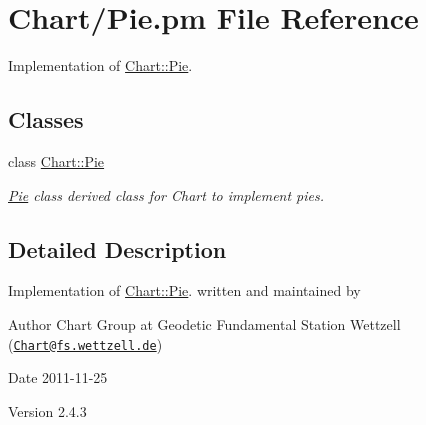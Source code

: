 \hypertarget{Pie_8pm}{
\section{Chart/Pie.pm File Reference}
\label{Pie_8pm}
}


Implementation of \hyperlink{classChart_1_1Pie}{Chart::Pie}.  


\subsection*{Classes}
\begin{DoxyCompactItemize}
\item 
class \hyperlink{classChart_1_1Pie}{Chart::Pie}
\begin{DoxyCompactList}\small\item\em \hyperlink{classChart_1_1Pie}{Pie} class derived class for Chart to implement pies. \item\end{DoxyCompactList}\end{DoxyCompactItemize}


\subsection{Detailed Description}
Implementation of \hyperlink{classChart_1_1Pie}{Chart::Pie}. written and maintained by \begin{DoxyAuthor}{Author}
Chart Group at Geodetic Fundamental Station Wettzell (\href{mailto:Chart@fs.wettzell.de}{\tt Chart@fs.wettzell.de}) 
\end{DoxyAuthor}
\begin{DoxyDate}{Date}
2011-\/11-\/25 
\end{DoxyDate}
\begin{DoxyVersion}{Version}
2.4.3 
\end{DoxyVersion}
